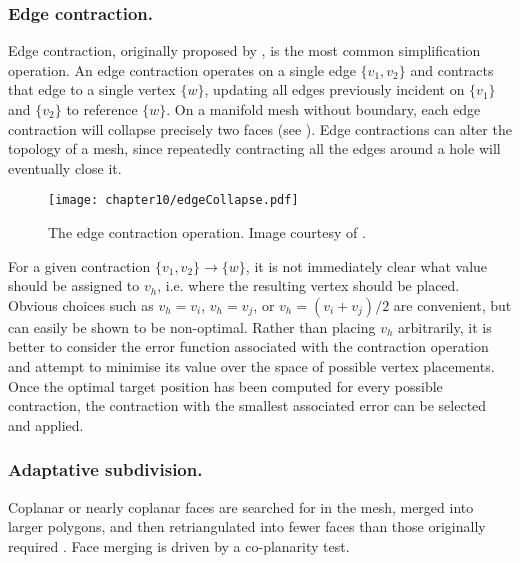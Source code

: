 \subsubsection*{Edge contraction.}
Edge contraction, originally proposed by \cite{Hoppe93}, is the most common simplification operation. An edge contraction operates on a single edge $\lbrace v_1,v_2 \rbrace$ and contracts that edge to a single vertex $\lbrace w \rbrace$, updating all edges previously incident on $\lbrace v_1 \rbrace$ and $\lbrace v_2 \rbrace$ to reference $\lbrace w \rbrace$. On a manifold mesh without boundary, each edge contraction will collapse precisely two faces (see ). Edge contractions can alter the topology of a mesh, since repeatedly contracting all the edges around a hole will eventually close it.
%
\begin{figure}
\centering
\texttt{[image: chapter10/edgeCollapse.pdf]}
\caption[The edge contraction operation]{The edge contraction operation. Image courtesy of \cite{Hoppe93}.}
\label{chap10:fig-edgeCollapse}
\end{figure}

For a given contraction $\lbrace v_1,v_2 \rbrace \rightarrow \lbrace w \rbrace$, it is not immediately clear what value should be assigned to $v_h$, i.e. where the resulting vertex should be placed. Obvious choices such as $v_h = v_i$, $v_h = v_j$, or $v_h = (v_i + v_j)/2$ are convenient, but can easily be shown to be non-optimal. Rather than placing $v_h$ arbitrarily, it is better to consider the error function associated with the contraction operation and attempt to minimise its value over the space of possible vertex placements. Once the optimal target position has been computed for every possible contraction, the contraction with the smallest associated error can be selected and applied.

\subsubsection*{Adaptative subdivision.}
Coplanar or nearly coplanar faces are searched for in the mesh, merged into larger polygons, and then retriangulated into fewer faces than those originally required \citep{Dehaemer91,Hinker93}. Face merging is driven by a co-planarity test. 

